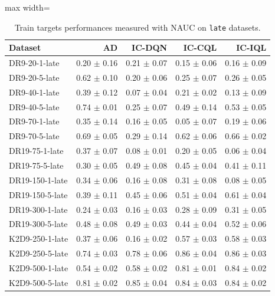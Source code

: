 \documentclass{article}
\begin{document}
\begin{table}[ht]
    \label{tab:}
    \begin{center}
     \caption{Train targets performances measured with NAUC on \texttt{late} datasets.}
    \begin{small}
    \begin{adjustbox}{max width=\columnwidth}
		\begin{tabular}{l|rrrr}
		\toprule
	\textbf{Dataset} & \textbf{AD} & \textbf{IC-DQN} & \textbf{IC-CQL} & \textbf{IC-IQL}\\
\midrule
DR9-20-1-late & 0.20 $\pm$ 0.16 & 0.21 $\pm$ 0.07 & 0.15 $\pm$ 0.06 & 0.16 $\pm$ 0.09\\
DR9-20-5-late & 0.62 $\pm$ 0.10 & 0.20 $\pm$ 0.06 & 0.25 $\pm$ 0.07 & 0.26 $\pm$ 0.05\\
DR9-40-1-late & 0.39 $\pm$ 0.12 & 0.07 $\pm$ 0.04 & 0.21 $\pm$ 0.02 & 0.13 $\pm$ 0.09\\
DR9-40-5-late & 0.74 $\pm$ 0.01 & 0.25 $\pm$ 0.07 & 0.49 $\pm$ 0.14 & 0.53 $\pm$ 0.05\\
DR9-70-1-late & 0.35 $\pm$ 0.14 & 0.16 $\pm$ 0.05 & 0.05 $\pm$ 0.07 & 0.19 $\pm$ 0.06\\
DR9-70-5-late & 0.69 $\pm$ 0.05 & 0.29 $\pm$ 0.14 & 0.62 $\pm$ 0.06 & 0.66 $\pm$ 0.02\\
DR19-75-1-late & 0.37 $\pm$ 0.07 & 0.08 $\pm$ 0.01 & 0.20 $\pm$ 0.05 & 0.06 $\pm$ 0.04\\
DR19-75-5-late & 0.30 $\pm$ 0.05 & 0.49 $\pm$ 0.08 & 0.45 $\pm$ 0.04 & 0.41 $\pm$ 0.11\\
DR19-150-1-late & 0.34 $\pm$ 0.06 & 0.16 $\pm$ 0.08 & 0.31 $\pm$ 0.08 & 0.08 $\pm$ 0.05\\
DR19-150-5-late & 0.39 $\pm$ 0.11 & 0.45 $\pm$ 0.06 & 0.51 $\pm$ 0.04 & 0.61 $\pm$ 0.04\\
DR19-300-1-late & 0.24 $\pm$ 0.03 & 0.16 $\pm$ 0.03 & 0.28 $\pm$ 0.09 & 0.31 $\pm$ 0.05\\
DR19-300-5-late & 0.48 $\pm$ 0.08 & 0.49 $\pm$ 0.03 & 0.44 $\pm$ 0.04 & 0.52 $\pm$ 0.06\\
K2D9-250-1-late & 0.37 $\pm$ 0.06 & 0.16 $\pm$ 0.02 & 0.57 $\pm$ 0.03 & 0.58 $\pm$ 0.03\\
K2D9-250-5-late & 0.74 $\pm$ 0.03 & 0.78 $\pm$ 0.06 & 0.86 $\pm$ 0.04 & 0.86 $\pm$ 0.03\\
K2D9-500-1-late & 0.54 $\pm$ 0.02 & 0.58 $\pm$ 0.02 & 0.81 $\pm$ 0.01 & 0.84 $\pm$ 0.02\\
K2D9-500-5-late & 0.81 $\pm$ 0.02 & 0.85 $\pm$ 0.04 & 0.84 $\pm$ 0.03 & 0.84 $\pm$ 0.02\\

\end{tabular}
\end{adjustbox}
\end{small}
\end{center}
\end{table}
\end{document}
